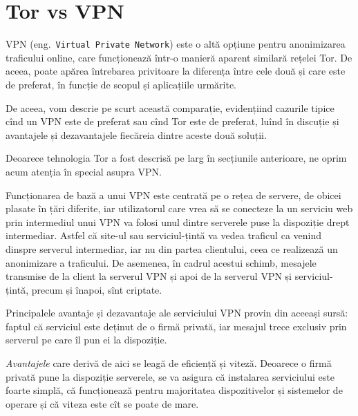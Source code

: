 
\chapter{Tor vs VPN}
\indent\indent VPN (eng.\ \texttt{Virtual Private Network}) este o altă opțiune pentru
anonimizarea traficului online, care funcționează într-o manieră aparent
similară rețelei Tor. De aceea, poate apărea întrebarea privitoare la
diferența între cele două și care este de preferat, în funcție de scopul
și aplicațiile urmărite.

De aceea, vom descrie pe scurt această comparație, evidențiind cazurile tipice
cînd un VPN este de preferat sau cînd Tor este de preferat, luînd în discuție
și avantajele și dezavantajele fiecăreia dintre aceste două soluții.

Deoarece tehnologia Tor a fost descrisă pe larg în secțiunile anterioare,
ne oprim acum atenția în special asupra VPN.

Funcționarea de bază a unui VPN este centrată pe o rețea de servere, de obicei
plasate în țări diferite, iar utilizatorul care vrea să se conecteze la un serviciu
web prin intermediul unui VPN va folosi unul dintre serverele puse la dispoziție
drept intermediar. Astfel că site-ul sau serviciul-țintă va vedea traficul ca venind
dinspre serverul intermediar, iar nu din partea clientului, ceea ce realizează
un anonimizare a traficului. De asemenea, în cadrul acestui schimb, mesajele transmise
de la client la serverul VPN și apoi de la serverul VPN și serviciul-țintă, precum
și înapoi, sînt criptate.

Principalele avantaje și dezavantaje ale serviciului VPN provin din aceeași sursă:
faptul că serviciul este deținut de o firmă privată, iar mesajul trece exclusiv prin
serverul pe care îl pun ei la dispoziție.

\textit{Avantajele} care derivă de aici se leagă de eficiență și viteză. Deoarece o firmă
privată pune la dispoziție serverele, se va asigura că instalarea serviciului este
foarte simplă, că funcționează pentru majoritatea dispozitivelor și sistemelor de
operare și că viteza este cît se poate de mare.

